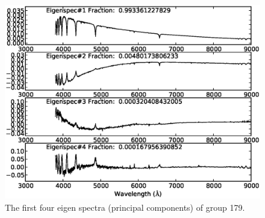 \documentclass[manuscript]{aastex}
\begin{document}
\begin{figure}
   \centering
   \includegraphics[width=14cm, angle=0,clip]{f72.eps}
   \caption{The first four eigen spectra (principal components) of group 179.
   }
   \label{Fig72}
\end{figure}
\end{document}
